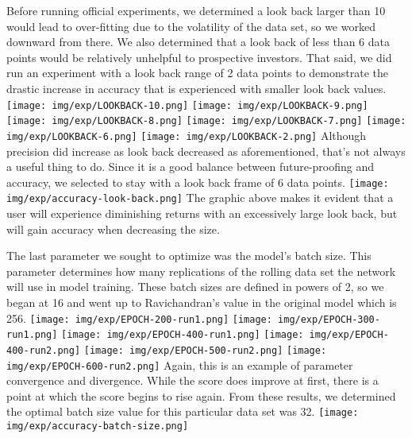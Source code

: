 \documentclass[compsoc]{IEEEtran}
\begin{document}
Before running official experiments, we determined a look back larger than 10 would lead to over-fitting due to the volatility of the data set, so we worked downward from there. We also determined that a look back of less than 6 data points would be relatively unhelpful to prospective investors. That said, we did run an experiment with a look back range of 2 data points to demonstrate the drastic increase in accuracy that is experienced with smaller look back values. 
\texttt{[image: img/exp/LOOKBACK-10.png]}
\texttt{[image: img/exp/LOOKBACK-9.png]}
\texttt{[image: img/exp/LOOKBACK-8.png]}
\texttt{[image: img/exp/LOOKBACK-7.png]}
\texttt{[image: img/exp/LOOKBACK-6.png]}
\texttt{[image: img/exp/LOOKBACK-2.png]}
Although precision did increase as look back decreased as aforementioned, that's not always a useful thing to do. Since it is a good balance between future-proofing and accuracy, we selected to stay with a look back frame of 6 data points.
\texttt{[image: img/exp/accuracy-look-back.png]}
The graphic above makes it evident that a user will experience diminishing returns with an excessively large look back, but will gain accuracy when decreasing the size.

The last parameter we sought to optimize was the model's batch size. This parameter determines how many replications of the rolling data set the network will use in model training. These batch sizes are defined in powers of 2, so we began at 16 and went up to Ravichandran's value in the original model which is 256.
\texttt{[image: img/exp/EPOCH-200-run1.png]}
\texttt{[image: img/exp/EPOCH-300-run1.png]}
\texttt{[image: img/exp/EPOCH-400-run1.png]}
\texttt{[image: img/exp/EPOCH-400-run2.png]}
\texttt{[image: img/exp/EPOCH-500-run2.png]}
\texttt{[image: img/exp/EPOCH-600-run2.png]}
Again, this is an example of parameter convergence and divergence. While the score does improve at first, there is a point at which the score begins to rise again. From these results, we determined the optimal batch size value for this particular data set was 32.
\texttt{[image: img/exp/accuracy-batch-size.png]}

\end{document}
